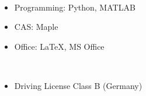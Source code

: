 \documentclass[a4paper,10pt]{article}
\newlength{\cvcolumngapwidth}
\newlength{\cvleftcolumnwidth}
\newlength{\cvrightcolumnwidth}
\newcommand{\cvheadingstyle}[1]{{\normalsize\textcolor{cvheadingcolor}{#1}}}
\newlength{\cvafteritemskipamount}
\newlength{\cvparskip}
\newcommand{\cvitem}[2]{
    \begin{minipage}[t]{\cvleftcolumnwidth}
    \strut\vspace*{-\baselineskip}\newline %
    \raggedleft #1
    \end{minipage}%
    \hspace{\cvcolumngapwidth}%
    \begin{minipage}[t]{\cvrightcolumnwidth}
        \setlength{\parskip}{\cvparskip}
        \strut\vspace*{-\baselineskip}\newline #2 %
    \end{minipage}

    \vspace{\cvafteritemskipamount}
}
\begin{document}
\cvitem{\cvheadingstyle{Computer skills}}{
    \\[-5.5ex]\begin{itemize}[leftmargin=*]
    	\item Programming: Python, MATLAB
    	\item CAS: Maple
    	\item Office: \LaTeX, MS Office
    \end{itemize}
}

\cvitem{\cvheadingstyle{Other}}{
	\\[-5.5ex]\begin{itemize}[leftmargin=*]
		\item Driving License Class B (Germany)

	\end{itemize}
}
\end{document}
